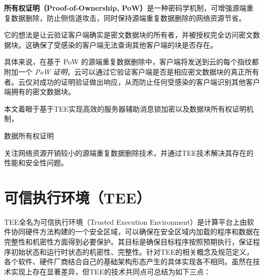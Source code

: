 \textbf{所有权证明（Proof-of-Ownership, PoW）}\cite{halevi11}是一种密码学机制，可增强源端重复数据删除，防止侧信道攻击，同时保持源端重复数据删除的网络资源节省。

它的想法是让云验证客户端确实是密文数据块的所有者，并被授权完全访问密文数据块。这确保了受感染的客户端无法查询其他客户端的块是否存在。

具体来说，在基于 PoW 的源端重复数据删除中，客户端将发送到云的每个指纹都附加一个\textit{ PoW 证明}，云可以通过它验证客户端是否是相应密文数据块的真正所有者。云仅对成功的证明验证做出响应，从而防止任何受感染的客户端识别其他客户端拥有的密文数据块。 



本文着眼于基于TEE实现高效的服务器辅助消息锁加密以及数据块所有权证明机制，

数据所有权证明


关注网络资源开销较小的源端重复数据删除技术，并通过TEE技术解决其存在的性能和安全性问题。


\section{可信执行环境（TEE）}
\label{sec:background-tee}

TEE全名为可信执行环境（Trusted Execution Environment）是计算平台上由软件协同硬件方法构建的一个安全区域，可以确保在安全区域内加载的程序和数据在完整性和机密性方面得到必要保护。其目标是确保目标程序按照预期执行，保证程序初始状态和运行时状态的机密性、完整性。针对TEE的相关概念及规范定义，各个软件、硬件厂商结合自己的基础架构形态产生的具体实现各不相同。虽然在技术实现上存在显著差异，但TEE的技术共同点可总结为如下三点：

